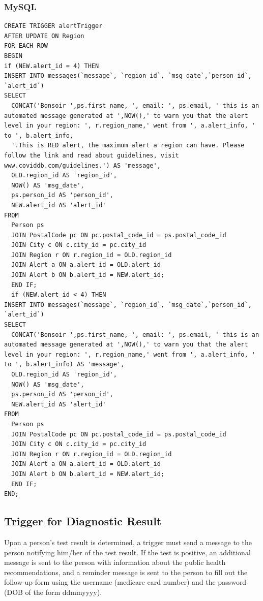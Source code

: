 \subsubsection{MySQL}
\begin{verbatim}
CREATE TRIGGER alertTrigger
AFTER UPDATE ON Region
FOR EACH ROW
BEGIN
if (NEW.alert_id = 4) THEN
INSERT INTO messages(`message`, `region_id`, `msg_date`,`person_id`, `alert_id`)
SELECT 
  CONCAT('Bonsoir ',ps.first_name, ', email: ', ps.email, ' this is an automated message generated at ',NOW(),' to warn you that the alert level in your region: ', r.region_name,' went from ', a.alert_info, ' to ', b.alert_info, 
  '.This is RED alert, the maximum alert a region can have. Please follow the link and read about guidelines, visit www.coviddb.com/guidelines.') AS 'message',
  OLD.region_id AS 'region_id',
  NOW() AS 'msg_date',
  ps.person_id AS 'person_id',
  NEW.alert_id AS 'alert_id'
FROM 
  Person ps
  JOIN PostalCode pc ON pc.postal_code_id = ps.postal_code_id
  JOIN City c ON c.city_id = pc.city_id
  JOIN Region r ON r.region_id = OLD.region_id
  JOIN Alert a ON a.alert_id = OLD.alert_id
  JOIN Alert b ON b.alert_id = NEW.alert_id;
  END IF;
  if (NEW.alert_id < 4) THEN
INSERT INTO messages(`message`, `region_id`, `msg_date`,`person_id`, `alert_id`)
SELECT 
  CONCAT('Bonsoir ',ps.first_name, ', email: ', ps.email, ' this is an automated message generated at ',NOW(),' to warn you that the alert level in your region: ', r.region_name,' went from ', a.alert_info, ' to ', b.alert_info) AS 'message',
  OLD.region_id AS 'region_id',
  NOW() AS 'msg_date',
  ps.person_id AS 'person_id',
  NEW.alert_id AS 'alert_id'
FROM 
  Person ps
  JOIN PostalCode pc ON pc.postal_code_id = ps.postal_code_id
  JOIN City c ON c.city_id = pc.city_id
  JOIN Region r ON r.region_id = OLD.region_id
  JOIN Alert a ON a.alert_id = OLD.alert_id
  JOIN Alert b ON b.alert_id = NEW.alert_id;
  END IF;
END; 
\end{verbatim}

\subsection{Trigger for Diagnostic Result}
Upon a person’s test result is determined, a trigger must send a message to the person notifying him/her of the test result. If the test is positive, an additional message is sent to the person with information about the public health recommendations, and a reminder message is sent to the person to fill out the follow-up-form using the username (medicare card number) and the password (DOB of the form ddmmyyyy).
